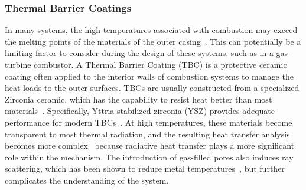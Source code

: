 \subsubsection{Thermal Barrier Coatings}
In many systems, the high temperatures associated with combustion may exceed the melting points of the materials of the outer casing~\cite{Flamant2019OpportunitiesCoatings}. This can potentially be a limiting factor to consider during the design of these systems, such as in a gas-turbine combustor.
A Thermal Barrier Coating (TBC) is a protective ceramic coating often applied to the interior walls of combustion systems to manage the heat loads to the outer surfaces. 
TBCs are usually constructed from a specialized Zirconia ceramic, which has the capability to resist heat
better than most materials~\cite{Miller1997ThermalDirections}. Specifically, Yttria-stabilized zirconia (YSZ) provides adequate performance for modern TBCs~\cite{Padture2002ThermalApplications,Padture2016AdvancedPropulsion}. At high temperatures, these materials become transparent to most thermal radiation, and the resulting heat transfer analysis becomes more complex~\cite{Howell2010ThermalTransfer, Siegel1998AnalysisCoatings} because radiative heat transfer plays a more significant role within the mechanism. The
introduction of gas-filled pores also induces ray scattering, which has been shown to reduce metal temperatures~\cite{Boissonnet2019EvolutionTemperature,Spuckler1996Two-FluxLayers}, but further complicates the understanding of the system.

